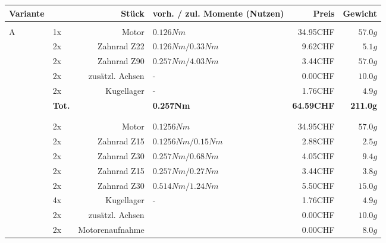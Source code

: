 \begin{figure}[h!]
    \begin{tabular}{p{0.5cm}p{0.8cm}rp{3cm}rr}
    \textbf{Variante} & \multicolumn{2}{r}{\textbf{Stück}} & \textbf{vorh. / zul. Momente (Nutzen)} & \textbf{Preis} & \textbf{Gewicht} \\\hline
          &       &                 &                      &          &  \\
    \multirow{9}[2]{*}{A}
          & 1x    & Motor           & $0.126 Nm$           & 34.95CHF & $57.0 g$ \\
          & 2x    & Zahnrad Z22     & $0.126 Nm / 0.33 Nm$ &  9.62CHF & $5.1 g$  \\
          & 2x    & Zahnrad Z90     & $0.257 Nm / 4.03 Nm$ &  3.44CHF & $57.0 g$ \\
          & 2x    & zusätzl. Achsen & -                    &  0.00CHF & $10.0 g$ \\
          & 2x    & Kugellager      & -                    &  1.76CHF & $4.9 g$  \\
       
      
          & \textbf{Tot.} &  & \textbf{0.257Nm} & \textbf{64.59CHF} & \textbf{211.0g} \\
    \multirow{10}[2]{*}{B}
  	  &       &                 &                      &          &  \\
          &       &                 &                      &          &  \\
          & 2x    & Motor           & $0.1256 Nm$          & 34.95CHF & $57.0 g$ \\
          & 2x    & Zahnrad Z15     & $0.1256 Nm / 0.15 Nm$& 2.88CHF  & $2.5 g$  \\
          & 2x    & Zahnrad Z30     & $0.257 Nm / 0.68 Nm$ & 4.05CHF  & $9.4 g$  \\
          & 2x    & Zahnrad Z15     & $0.257 Nm / 0.27 Nm$ & 3.44CHF  & $3.8 g$  \\
          & 2x    & Zahnrad Z30     & $0.514 Nm / 1.24 Nm$ & 5.50CHF  & $15.0 g$ \\
          & 4x    & Kugellager      & -                    & 1.76CHF  & $4.9 g$  \\
          & 2x    & zusätzl. Achsen &                      & 0.00CHF  & $10.0 g$ \\
          & 2x    & Motorenaufnahme &                      & 0.00CHF  & $8.0 g$  \\
        

\end{tabular}
\end{figure}
